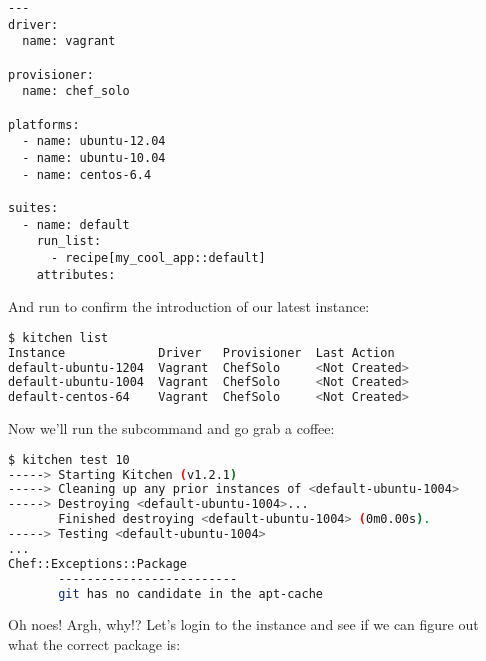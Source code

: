 \begin{lstlisting}[label=lst:testing-test-kitchen26]
---
driver:
  name: vagrant

provisioner:
  name: chef_solo

platforms:
  - name: ubuntu-12.04
  - name: ubuntu-10.04
  - name: centos-6.4

suites:
  - name: default
    run_list:
      - recipe[my_cool_app::default]
    attributes:
\end{lstlisting}

And run  to confirm the introduction of our latest instance:

\begin{lstlisting}[language=Bash,label=lst:testing-test-kitchen27]
$ kitchen list
Instance             Driver   Provisioner  Last Action
default-ubuntu-1204  Vagrant  ChefSolo     <Not Created>
default-ubuntu-1004  Vagrant  ChefSolo     <Not Created>
default-centos-64    Vagrant  ChefSolo     <Not Created>
\end{lstlisting}

Now we'll run the  subcommand and go grab a coffee:

\begin{lstlisting}[language=Bash,label=lst:testing-test-kitchen28]
$ kitchen test 10
-----> Starting Kitchen (v1.2.1)
-----> Cleaning up any prior instances of <default-ubuntu-1004>
-----> Destroying <default-ubuntu-1004>...
       Finished destroying <default-ubuntu-1004> (0m0.00s).
-----> Testing <default-ubuntu-1004>
...
Chef::Exceptions::Package
       -------------------------
       git has no candidate in the apt-cache
\end{lstlisting}

Oh noes! Argh, why!? Let's login to the instance and see if we can figure out what the correct package is:

